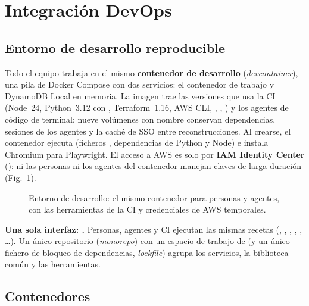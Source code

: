 \section{Integración DevOps}\label{sec:devops}

\subsection{Entorno de desarrollo reproducible}

Todo el equipo trabaja en el mismo \textbf{contenedor de desarrollo} (\emph{devcontainer}), una pila de Docker
Compose con dos servicios: el contenedor de trabajo y DynamoDB Local en memoria. La imagen trae las versiones que usa la CI (Node~24,
Python~3.12 con , Terraform~1.16, AWS CLI, , , )
y los agentes de código de terminal; nueve volúmenes con nombre conservan
dependencias, sesiones de los agentes y la caché de SSO entre reconstrucciones. Al
crearse, el contenedor ejecuta  (ficheros , dependencias de Python y Node)
e instala Chromium para Playwright. El acceso a AWS es solo por \textbf{IAM Identity Center}
(): ni las personas ni los agentes del contenedor manejan claves de larga
duración (Fig.~\ref{fig:devcontainer}).

\begin{figure}[h]
\centering
\resizebox{\columnwidth}{!}{}
\caption{Entorno de desarrollo: el mismo contenedor para personas y agentes, con las herramientas de la CI y credenciales de AWS temporales.}\label{fig:devcontainer}
\end{figure}

\textbf{Una sola interfaz: .} Personas, agentes y CI ejecutan las mismas recetas
(, , , , ,
\ldots). Un único repositorio (\emph{monorepo}) con un espacio de trabajo de  (y un único
fichero de bloqueo de dependencias, \emph{lockfile}) agrupa los servicios, la biblioteca común y
las herramientas.

\subsection{Contenedores}\label{sec:contenedores}

